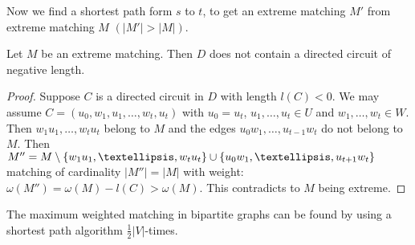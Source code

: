 Now we find a shortest path form $s$ to $t$, to get an extreme matching $M'$ 
from extreme matching $M$ $(|M'| > |M|)$.

\begin{thm}
	Let $M$ be an extreme matching. Then $D$ does not contain a directed circuit 
	of negative length.
\end{thm}

\begin{proof}
	Suppose $C$ is a directed circuit in $D$ with length $l(C) < 0$. We may assume 
	$C=(u_0, w_1, u_1, …, w_t, u_t)$ with $u_0=u_t$, $u_1, …, u_t \in U$ and 
	$w_1, …, w_t \in W$. Then $w_1u_1, …, w_tu_t$ belong to $M$ and the edges 
	$u_0w_1, …, u_{t-1}w_t$ do not belong to $M$.
	Then $M''=M\setminus \plainset{w_1u_1, …, w_tu_t} \cup \plainset{u_0w_1, …, u_{t+1}w_t}$
	matching of cardinality $|M''| = |M|$ with weight: $\omega(M'') = \omega(M) - l(C) > \omega(M)$.
	This contradicts to $M$ being extreme.
\end{proof}

\begin{cor}
	The maximum weighted matching in bipartite graphs can be found by using a 
	shortest path algorithm $\frac{1}{2}|V|$-times.
\end{cor}